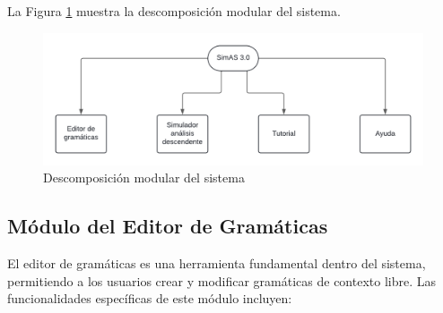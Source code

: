  La Figura \ref{fig:diagrama-descomposicion} muestra la descomposición modular del sistema.
 
\begin{figure}[!ht]
   \begin{center} 
     \includegraphics[width=1\textwidth]{figuras/Cap6/diagrama-descomposicion.png}
     \caption{Descomposición modular del sistema}\label{fig:diagrama-descomposicion}
   \end{center}
 \end{figure}


\subsection{Módulo del Editor de Gramáticas}

El editor de gramáticas es una herramienta fundamental dentro del sistema, permitiendo a los usuarios crear y modificar gramáticas de contexto libre. Las funcionalidades específicas de este módulo incluyen:

